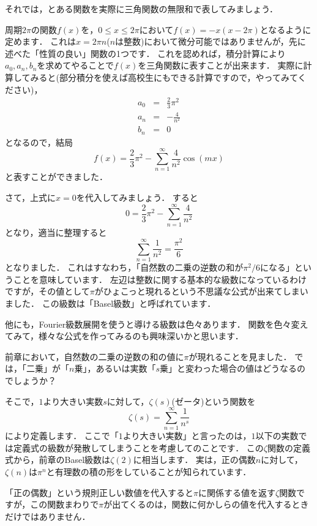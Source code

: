 それでは，とある関数を実際に三角関数の無限和で表してみましょう．

周期$2 \pi$の関数$f(x)$を，$0 \le x \le 2\pi$において$f(x)=-x(x-2 \pi)$となるように定めます．
これは$x=2\pi n$($n$は整数)において微分可能ではありませんが，先に述べた「性質の良い」関数の1つです．
これを認めれば，積分計算により$a_0, a_n, b_n$を求めてやることで$f(x)$を三角関数に表すことが出来ます．
実際に計算してみると(部分積分を使えば高校生にもできる計算ですので，やってみてください)，
\begin{eqnarray*}
	a_0 &=& \frac{2}{3}\pi ^2 \\
	a_n &=& -\frac{4}{n^2} \\
	b_n &=& 0
\end{eqnarray*}
となるので，結局
\[
	f(x)=\frac{2}{3}\pi ^2-\sum_{n=1}^{\infty} \frac{4}{n^2} \cos (mx)
\]
と表すことができました．

さて，上式に$x=0$を代入してみましょう．
すると
\[
	0=\frac{2}{3}\pi ^2-\sum_{n=1}^{\infty} \frac{4}{n^2}
\]
となり，適当に整理すると
\[
	\sum_{n=1}^{\infty} \frac{1}{n^2} = \frac{\pi ^2}{6}
\]
となりました．
これはすなわち，「自然数の二乗の逆数の和が$\pi ^2 /6$になる」ということを意味しています．
左辺は整数に関する基本的な級数になっているわけですが，その値として$\pi$がひょこっと現れるという不思議な公式が出来てしまいました．
この級数は「Basel級数」と呼ばれています．

他にも，Fourier級数展開を使うと導ける級数は色々あります．
関数を色々変えてみて，様々な公式を作ってみるのも興味深いかと思います．


前章において，自然数の二乗の逆数の和の値に$\pi$が現れることを見ました．
では，「二乗」が「$n$乗」，あるいは実数「$s$乗」と変わった場合の値はどうなるのでしょうか？

そこで，$1$より大きい実数$s$に対して，$\zeta (s)$(ゼータ)という関数を
\[
	\zeta (s) = \sum_{n=1}^{\infty} \frac{1}{n^{s}}
\]
により定義します．
ここで「$1$より大きい実数」と言ったのは，$1$以下の実数では定義式の級数が発散してしまうことを考慮してのことです．
この$\zeta$関数の定義式から，前章のBasel級数は$\zeta (2)$に相当します．
実は，正の偶数$n$に対して，$\zeta (n)$は$\pi ^{n}$と有理数の積の形をしていることが知られています．

「正の偶数」という規則正しい数値を代入すると$\pi$に関係する値を返す$\zeta$関数ですが，この関数まわりで$\pi$が出てくるのは，関数に何かしらの値を代入するときだけではありません．


